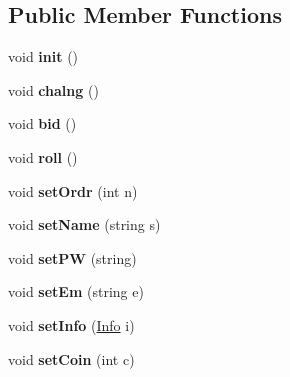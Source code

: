 \subsection*{Public Member Functions}
\begin{DoxyCompactItemize}
\item 
\hypertarget{class_player_a015ea21fa1e7273e47d48cb20d9b12e3}{}void {\bfseries init} ()\label{class_player_a015ea21fa1e7273e47d48cb20d9b12e3}

\item 
\hypertarget{class_player_adf643edc00fc1718c1fbb34b3693ca78}{}void {\bfseries chalng} ()\label{class_player_adf643edc00fc1718c1fbb34b3693ca78}

\item 
\hypertarget{class_player_afaedda878ae614e71ed711a5b2bc0967}{}void {\bfseries bid} ()\label{class_player_afaedda878ae614e71ed711a5b2bc0967}

\item 
\hypertarget{class_player_af5a03535109b8f5c1a403cb5a4175f42}{}void {\bfseries roll} ()\label{class_player_af5a03535109b8f5c1a403cb5a4175f42}

\item 
\hypertarget{class_player_a78d6a5df3a6dc042a39f8ffe8b6b570e}{}void {\bfseries set\+Ordr} (int n)\label{class_player_a78d6a5df3a6dc042a39f8ffe8b6b570e}

\item 
\hypertarget{class_player_afd1ae6430f71864ab3289d1d00bd9deb}{}void {\bfseries set\+Name} (string s)\label{class_player_afd1ae6430f71864ab3289d1d00bd9deb}

\item 
\hypertarget{class_player_aa6c5e0dd054a620f9a1f8070c3b3cfc3}{}void {\bfseries set\+P\+W} (string)\label{class_player_aa6c5e0dd054a620f9a1f8070c3b3cfc3}

\item 
\hypertarget{class_player_a1d148613cd3164d31114e48525f59da6}{}void {\bfseries set\+Em} (string e)\label{class_player_a1d148613cd3164d31114e48525f59da6}

\item 
\hypertarget{class_player_a91eb5ff686390a15d8805001992cdd02}{}void {\bfseries set\+Info} (\hyperlink{struct_info}{Info} i)\label{class_player_a91eb5ff686390a15d8805001992cdd02}

\item 
\hypertarget{class_player_a9e0cf9b16c393adc49534202e392a49f}{}void {\bfseries set\+Coin} (int c)\label{class_player_a9e0cf9b16c393adc49534202e392a49f}


\end{DoxyCompactItemize}

